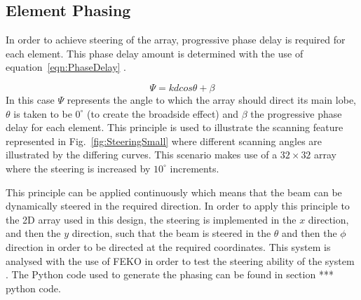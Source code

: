 \documentclass[11pt]{witseiepaper}
\begin{document}
\subsection{Element Phasing} \label{sec:ElementPhasing}
In order to achieve steering of the array, progressive phase delay is required for each element. This phase delay amount is determined with the use of equation~\ref{eqn:PhaseDelay} \cite[p.~301]{Balanis}.

\begin{equation} \label{eqn:PhaseDelay}
\Psi = k d cos \theta + \beta
\end{equation}
In this case $\Psi$ represents the angle to which the array should direct its main lobe, $\theta$ is taken to be $0^{\circ}$ (to create the broadside effect) and $\beta$ the progressive phase delay for each element.
This principle is used to illustrate the scanning feature represented in Fig.~\ref{fig:SteeringSmall} where different scanning angles are illustrated by the differing curves. This scenario makes use of a $32 \times 32$ array where the steering is increased by $10^{\circ}$ increments.

This principle can be applied continuously which means that the beam can be dynamically steered in the required direction.
In order to apply this principle to the 2D array used in this design, the steering is implemented in the $x$ direction, and then the $y$ direction, such that the beam is steered in the $\theta$ and then the $\phi$ direction in order to be directed at the required coordinates.
This system is analysed with the use of FEKO in order to test the steering ability of the system \cite{FEKO}. The Python code used to generate the phasing can be found in section *** python code.
\end{document}
